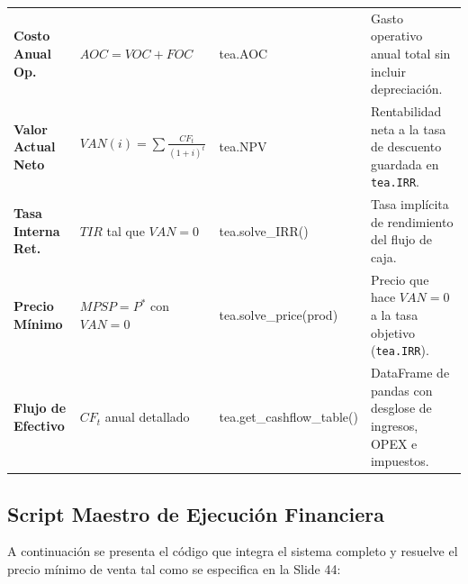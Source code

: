 \documentclass[11pt,letterpaper]{article}
\begin{document}
\begin{table}[htbp]
\begin{tabularx}{\textwidth}{>{\raggedright\arraybackslash}p{2.6cm} >{\raggedright\arraybackslash}p{2.8cm} >{\raggedright\arraybackslash\ttfamily}p{3.8cm} X}
        \textbf{Costo Anual Op.} & $AOC = VOC + FOC$ & tea.AOC & Gasto operativo anual total sin incluir depreciación. \\
        \rowcolor{tablerowgray}
        \textbf{Valor Actual Neto} & $VAN(i) = \sum \frac{CF_t}{(1+i)^t}$ & tea.NPV & Rentabilidad neta a la tasa de descuento guardada en \texttt{tea.IRR}. \\
        \textbf{Tasa Interna Ret.} & $TIR$ tal que $VAN = 0$ & tea.solve\_IRR() & Tasa implícita de rendimiento del flujo de caja. \\
        \rowcolor{tablerowgray}
        \textbf{Precio Mínimo} & $MPSP = P^*$ con $VAN = 0$ & tea.solve\_price(prod) & Precio que hace $VAN = 0$ a la tasa objetivo (\texttt{tea.IRR}). \\
        \textbf{Flujo de Efectivo} & $CF_t$ anual detallado & tea.get\_cashflow\_\allowbreak table() & DataFrame de pandas con desglose de ingresos, OPEX e impuestos. \\
        \bottomrule
    \end{tabularx}
\end{table}

\subsection{Script Maestro de Ejecución Financiera}
A continuación se presenta el código que integra el sistema completo y resuelve el precio mínimo de venta tal como se especifica en la Slide 44:
\end{document}
